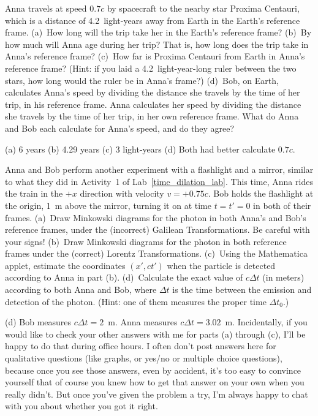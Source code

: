 \begin{Exercise}
Anna travels at speed $0.7c$ by spacecraft to the nearby star Proxima Centauri, which is a distance of 4.2~light-years away from Earth in the Earth's reference frame.  (a)~How long will the trip take her in the Earth's reference frame?  (b)~By how much will Anna age during her trip?  That is, how long does the trip take in Anna's reference frame?  (c)~How far is Proxima Centauri from Earth in Anna's reference frame?  (Hint: if you laid a 4.2~light-year-long ruler between the two stars, how long would the ruler be in Anna's frame?)  (d)~Bob, on Earth, calculates Anna's speed by dividing the distance she travels by the time of her trip, in his reference frame.  Anna calculates her speed by dividing the distance she travels by the time of her trip, in her own reference frame.  What do Anna and Bob each calculate for Anna's speed, and do they agree?
\end{Exercise}
\begin{Answer}
(a) 6 years (b) 4.29 years (c) 3 light-years (d) Both had better calculate $0.7c$.
\end{Answer}


\begin{Exercise}
Anna and Bob perform another experiment with a flashlight and a mirror, similar to what they did in Activity~1 of Lab~\ref{time_dilation_lab}.  This time, Anna rides the train in the $+x$ direction with velocity $v=+0.75c$.  Bob holds the flashlight at the origin, 1~m above the mirror, turning it on at time $t=t'=0$ in both of their frames.  (a)~Draw Minkowski diagrams for the photon in both Anna's and Bob's reference frames, under the (incorrect) Galilean Transformations.  Be careful with your signs! (b)~Draw Minkowski diagrams for the photon in both reference frames under the (correct) Lorentz Transformations.  (c)~Using the Mathematica applet, estimate the coordinates $(x', ct')$ when the particle is detected according to Anna in part (b).  (d)~Calculate the exact value of $c \Delta t$ (in meters) according to both Anna and Bob, where $\Delta t$ is the time between the emission and detection of the photon.  (Hint: one of them measures the proper time $\Delta t_0$.) 
\end{Exercise}
\begin{Answer}
(d) Bob measures $c \Delta t=2$~m.  Anna measures $c \Delta t=3.02$~m.  Incidentally, if you would like to check your other answers with me for parts (a) through (c), I'll be happy to do that during office hours.  I often don't post answers here for qualitative questions (like graphs, or yes/no or multiple choice questions), because once you see those answers, even by accident, it's too easy to convince yourself that of course you knew how to get that answer on your own when you really didn't.  But once you've given the problem a try, I'm always happy to chat with you about whether you got it right.
\end{Answer}


